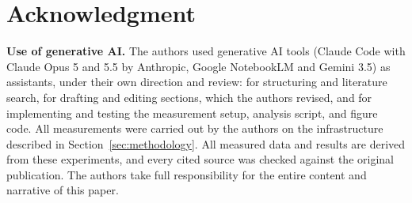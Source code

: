 \section*{Acknowledgment}

\textbf{Use of generative AI.} The authors used generative AI tools (Claude Code with Claude Opus 5 and 5.5 by Anthropic, Google NotebookLM and Gemini 3.5) as assistants, under their own direction and review: for structuring and literature search, for drafting and editing sections, which the authors revised, and for implementing and testing the measurement setup, analysis script, and figure code. All measurements were carried out by the authors on the infrastructure described in Section~\ref{sec:methodology}. All measured data and results are derived from these experiments, and every cited source was checked against the original publication. The authors take full responsibility for the entire content and narrative of this paper.
